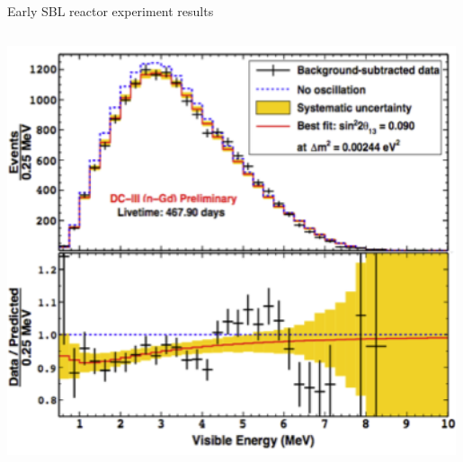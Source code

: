 \begin{frame}{Early SBL reactor experiment results}
\begin{columns}
\begin{column}{0.40\textwidth}
     \includegraphics[width=0.99\textwidth]{./images/3nu/reactor/doublechooz_results_spectrum_2014.png}
  \end{column}
\end{columns}
\end{frame}

%
%
%

